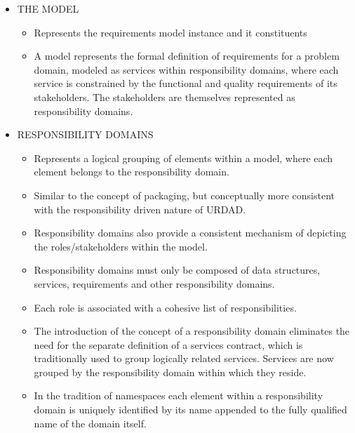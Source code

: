 \begin{itemize}
\begin{itemize}
\begin{itemize}
				\item THE MODEL
					\begin{itemize}
						\item Represents the requirements model instance and it constituents
						\item A model represents the formal definition of requirements for a problem domain, modeled as services within responsibility domains, where each service is constrained by the functional and quality requirements of its stakeholders. The stakeholders are themselves represented as responsibility domains.
					\end{itemize}
					
				\item RESPONSIBILITY DOMAINS
					\begin{itemize}
						\item Represents a logical grouping of elements within a model, where each element belongs to the responsibility domain.
						\item Similar to the concept of packaging, but conceptually more consistent with the responsibility driven nature of URDAD.
						\item Responsibility domains also provide a consistent mechanism of depicting the roles/stakeholders within the model.
						\item Responsibility domains must only be composed of data structures, services, requirements and other responsibility domains.
						\item Each role is associated with a cohesive list of responsibilities.
						\item The introduction of the concept of a responsibility domain eliminates the need for the separate definition of a services contract, which is traditionally used to group logically related services. Services are now grouped by the responsibility domain within which they reside.
						\item In the tradition of namespaces each element within a responsibility domain is uniquely identified by its name appended to the fully qualified name of the domain itself.
					\end{itemize}
					
					
					

\end{itemize}
\end{itemize}
\end{itemize}
